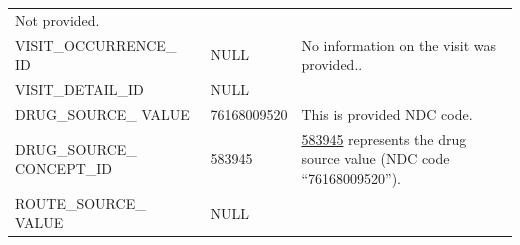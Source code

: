 \documentclass[11pt]{book}
\theoremstyle{definition}
\theoremstyle{definition}
\theoremstyle{definition}
\theoremstyle{remark}
\begin{document}
\begin{longtable}[]{@{}lll@{}}
\begin{minipage}[t]{0.48\columnwidth}
Not provided.\strut
\end{minipage}\tabularnewline
\begin{minipage}[t]{0.28\columnwidth}\raggedright\strut
VISIT\_OCCURRENCE\_ ID\strut
\end{minipage} & \begin{minipage}[t]{0.16\columnwidth}\raggedright\strut
NULL\strut
\end{minipage} & \begin{minipage}[t]{0.48\columnwidth}\raggedright\strut
No information on the visit was provided..\strut
\end{minipage}\tabularnewline
\begin{minipage}[t]{0.28\columnwidth}\raggedright\strut
VISIT\_DETAIL\_ID\strut
\end{minipage} & \begin{minipage}[t]{0.16\columnwidth}\raggedright\strut
NULL\strut
\end{minipage} & \begin{minipage}[t]{0.48\columnwidth}\raggedright\strut
\strut
\end{minipage}\tabularnewline
\begin{minipage}[t]{0.28\columnwidth}\raggedright\strut
DRUG\_SOURCE\_ VALUE\strut
\end{minipage} & \begin{minipage}[t]{0.16\columnwidth}\raggedright\strut
76168009520\strut
\end{minipage} & \begin{minipage}[t]{0.48\columnwidth}\raggedright\strut
This is provided NDC code.\strut
\end{minipage}\tabularnewline
\begin{minipage}[t]{0.28\columnwidth}\raggedright\strut
DRUG\_SOURCE\_ CONCEPT\_ID\strut
\end{minipage} & \begin{minipage}[t]{0.16\columnwidth}\raggedright\strut
583945\strut
\end{minipage} & \begin{minipage}[t]{0.48\columnwidth}\raggedright\strut
\href{http://athena.ohdsi.org/search-terms/terms/750264}{583945}
represents the drug source value (NDC code ``76168009520'').\strut
\end{minipage}\tabularnewline
\begin{minipage}[t]{0.28\columnwidth}\raggedright\strut
ROUTE\_SOURCE\_ VALUE\strut
\end{minipage} & \begin{minipage}[t]{0.16\columnwidth}\raggedright\strut
NULL\strut
\end{minipage} & \begin{minipage}[t]{0.48\columnwidth}\raggedright\strut
\strut
\end{minipage}\tabularnewline
\bottomrule
\end{longtable}
\end{document}
